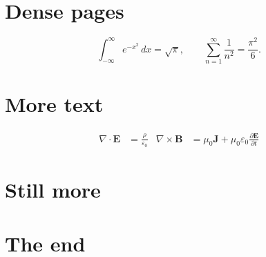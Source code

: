 \documentclass[11pt]{article}
\begin{document}
\section{Dense pages}
\lipsum[1-4]
\begin{equation}
  \int_{-\infty}^{\infty} e^{-x^2}\,dx = \sqrt{\pi},
  \qquad
  \sum_{n=1}^{\infty} \frac{1}{n^2} = \frac{\pi^2}{6}.
\end{equation}
\lipsum[5-12]
\section{More text}
\begin{align}
  \nabla \cdot \mathbf{E} &= \frac{\rho}{\varepsilon_0} &
  \nabla \times \mathbf{B} &= \mu_0 \mathbf{J} + \mu_0 \varepsilon_0 \frac{\partial \mathbf{E}}{\partial t}
\end{align}
\lipsum[13-30]
\section{Still more}
\lipsum[31-50]
\section{The end}
\lipsum[51-70]
\end{document}
